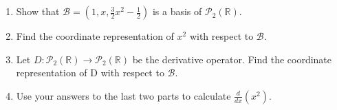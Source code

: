 \documentclass[12 pt]{article}
\newenvironment{problem}[2][Problem]{\begin{trivlist}
\item[\hskip \labelsep {\bfseries #1}\hskip \labelsep {\bfseries #2.}]}{\end{trivlist}}
\theoremstyle{definition}
\newcommand{\R}{\mathbb{R}} %
\newcommand{\poly}[2]{\mathscr{P}_#2(#1)}
\begin{document}
\begin{problem}{3.5.12}
\\ \\  
\begin{enumerate}[label=(\alph*)]
    \item Show that $\mathscr{B}=(1,x,\frac{3}{2}x^2-\frac{1}{2})$ is a basis of $\poly{\R}{2}$.
    \item Find the coordinate representation of $x^2$ with respect to $\mathscr{B}$.
    \item Let $D:\poly{\R}{2}\to\poly{\R}{2}$ be the derivative operator. Find the coordinate representation of D with respect to $\mathscr{B}$.
    \item Use your answers to the last two parts to calculate $\frac{d}{dx}(x^2)$.
\end{enumerate}
\end{problem}
\end{document}
